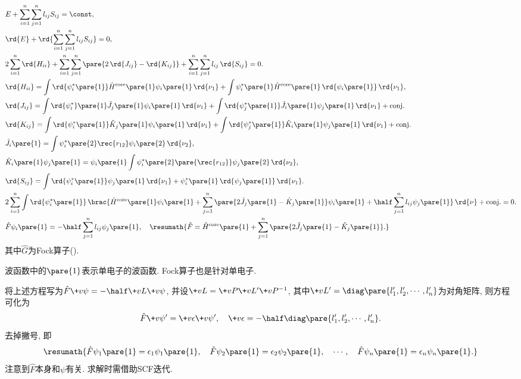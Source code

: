 \documentclass[hidelinks]{ctexart}
\begin{document}
\begin{align*}
    & E + \sum_{i=1}^n \sum_{j=1}^n l_{ij}S_{ij} = \const, \\
    & \rd{E} + \rd{\sum_{i=1}^n \sum_{j=1}^n l_{ij} S_{ij}} = 0, \\
    & 2\sum_{i=1}^n \rd{H_{ii}} + \sum_{i=1}^n \sum_{j=1}^n \pare{2\,\rd{J_{ij}} - \rd{K_{ij}}} + \sum_{i=1}^n \sum_{j=1}^n l_{ij}\,\rd{S_{ij}} = 0. \\
    & \rd{H_{ii}} = \int \rd{\psi^*_i\pare{1}}\hat H^{\mathrm{core}}\pare{1}\psi_i\pare{1}\,\rd{\nu_1} + \int \psi^*_i\pare{1}\hat H^{\mathrm{core}}\pare{1}\,\rd{\psi_i\pare{1}}\,\rd{\nu_1}, \\
    & \rd{J_{ij}} = \int \rd{\psi^*_i}\pare{1}\hat J_j\pare{1} \psi_i\pare{1}\,\rd{\nu_1} + \int \rd{\psi^*_j\pare{1}}\hat J_i\pare{1}\psi_j\pare{1}\,\rd{\nu_1} + \mathrm{conj}. \\
    & \rd{K_{ij}} = \int \rd{\psi_i^*\pare{1}}\hat K_j\pare{1}\psi_i\pare{1}\,\rd{\nu_1} + \int \rd{\psi^*_j\pare{1}}\hat K_i\pare{1} \psi_j\pare{1}\,\rd{\nu_1} + \mathrm{conj}. \\
    & \hat J_i\pare{1} = \int \psi_i^* \pare{2}\rec{r_{12}}\psi_i\pare{2}\,\rd{\nu_2}, \\
    & \hat K_i\pare{1}\psi_j\pare{1} = \psi_i\pare{1}\int \psi_i^*\pare{2}\pare{\rec{r_{12}}}\psi_j\pare{2}\,\rd{\nu_2}, \\
    & \rd{S_{ij}} = \int \rd{\psi_i^*\pare{1}}\psi_j\pare{1}\,\rd{\nu_1} + \psi_i^*\pare{1}\,\rd{\psi_j\pare{1}}\,\rd{\nu_1}. \\
    & 2 \sum_{i=1}^n \int \rd{\psi_i^*\pare{1}}\,\brac{\hat H^{\mathrm{core}}\pare{1}\psi_i\pare{1} + \sum_{j=1}^n \pare{2\hat J_j\pare{1} - \hat K_j\pare{1}} \psi_i\pare{1} + \half \sum_{j=1}^n l_{ij}\psi_j\pare{1}}\,\rd{\nu} + \mathrm{conj}. = 0. \\
    & \hat F \psi_i\pare{1} = -\half \sum_{j=1}^n l_{ij}\psi_j\pare{1},\quad \resumath{\hat F = \hat H^{\mathrm{core}}\pare{1} + \sum_{j=1}^n\pare{2\hat J_j\pare{1} - \hat K_j\pare{1}}.}
\end{align*}
其中$\hat G$为Fock算子().
\begin{pitfall}
    波函数中的$\pare{1}$表示单电子的波函数. Fock算子也是针对单电子.
\end{pitfall}
将上述方程写为$\displaystyle \hat F \+v\psi = -\half \+vL\+v\psi$, 并设$\+vL = \+vP\+vL'\+vP^{-1}$, 其中$\+vL' = \diag\pare{l'_1,l'_2,\cdots,l'_n}$为对角矩阵, 则方程可化为
\[ \hat F\+v\psi' = \+v\epsilon \+v\psi',\quad \+v\epsilon = -\half \diag\pare{l'_1,l'_2,\cdots,l'_n}. \]
去掉撇号, 即
\[ \resumath{\hat F\psi_1\pare{1} = \epsilon_1 \psi_1\pare{1},\quad \hat F\psi_2\pare{1} = \epsilon_2\psi_2\pare{1}, \quad \cdots,\quad \hat F\psi_n\pare{1} = \epsilon_n\psi_n\pare{1}.} \]
注意到$\hat F$本身和$\psi$有关. 求解时需借助SCF迭代.
\end{document}
